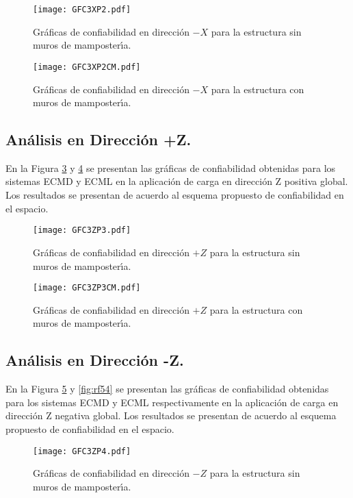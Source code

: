 \begin{figure} [htbp]
\centering
\texttt{[image: GFC3XP2.pdf]}
\caption{Gr\'aficas de confiabilidad en direcci\'on $-X$ para la estructura sin muros de mamposter\'{\i}a.}
\label{fig:rf37}
\end{figure}

\begin{figure} [htbp]
\centering
\texttt{[image: GFC3XP2CM.pdf]}
\caption{Gr\'aficas de confiabilidad en direcci\'on $-X$ para la estructura con muros de mamposter\'{\i}a.}
\label{fig:rf38}
\end{figure}

\newpage

\subsection{An\'alisis en Direcci\'on +Z.}

En la Figura \ref{fig:rf47} y \ref{fig:rf48} se presentan las gr\'aficas de confiabilidad obtenidas para los sistemas ECMD y ECML en la aplicaci\'on de carga en direcci\'on Z positiva global. Los resultados se presentan de acuerdo al esquema propuesto de confiabilidad en el espacio.

\begin{figure} [htbp]
\centering
\texttt{[image: GFC3ZP3.pdf]}
\caption{Gr\'aficas de confiabilidad en direcci\'on $+Z$ para la estructura sin muros de mamposter\'{\i}a.}
\label{fig:rf47}
\end{figure}

\begin{figure} [htbp]
\centering
\texttt{[image: GFC3ZP3CM.pdf]}
\caption{Gr\'aficas de confiabilidad en direcci\'on $+Z$ para la estructura con muros de mamposter\'{\i}a.}
\label{fig:rf48}
\end{figure}

\newpage

\subsection{An\'alisis en Direcci\'on -Z.}

En la Figura \ref{fig:rf53} y \ref{fig:rf54} se presentan las gr\'aficas de confiabilidad obtenidas para los sistemas ECMD y ECML respectivamente en la aplicaci\'on de carga en direcci\'on Z negativa global. Los resultados se presentan de acuerdo al esquema propuesto de confiabilidad en el espacio.

\begin{figure} [htbp]
\centering
\texttt{[image: GFC3ZP4.pdf]}
\caption{Gr\'aficas de confiabilidad en direcci\'on $-Z$ para la estructura sin muros de mamposter\'{\i}a.}
\label{fig:rf53}
\end{figure}

